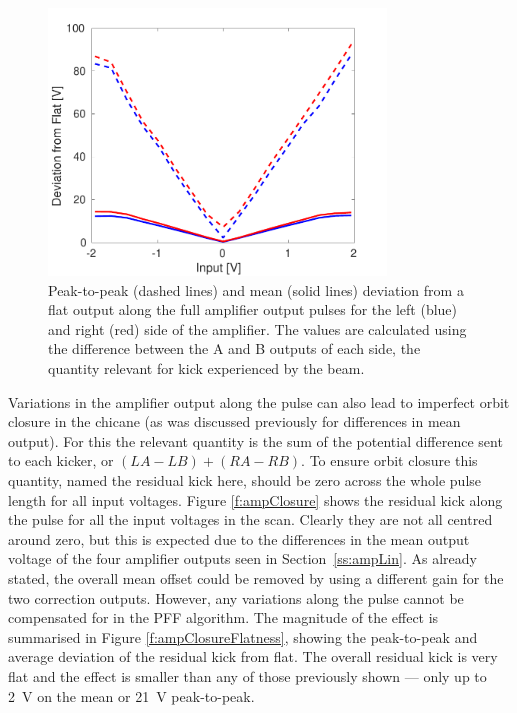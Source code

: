 \begin{figure}
  \centering
  \includegraphics[width=0.8\textwidth]{Figures/commissioning/AmpFlatness}
  \caption{Peak-to-peak (dashed lines) and mean (solid lines) deviation from a flat output along the full amplifier output pulses for the left (blue) and right (red) side of the amplifier. The values are calculated using the difference between the A and B outputs of each side, the quantity relevant for kick experienced by the beam.}
  \label{f:ampFlatness}
\end{figure}

Variations in the amplifier output along the pulse can also lead to imperfect orbit closure in the chicane (as was discussed previously for differences in mean output). For this the relevant quantity is the sum of the potential difference sent to each kicker, or \((LA-LB)+(RA-RB)\). To ensure orbit closure this quantity, named the residual kick here, should be zero across the whole pulse length for all input voltages. Figure \ref{f:ampClosure} shows the residual kick along the pulse for all the input voltages in the scan. Clearly they are not all centred around zero, but this is expected due to the differences in the mean output voltage of the four amplifier outputs seen in Section~\ref{ss:ampLin}. As already stated, the overall mean offset could be removed by using a different gain for the two correction outputs. However, any variations along the pulse cannot be compensated for in the PFF algorithm. The magnitude of the effect is summarised in Figure \ref{f:ampClosureFlatness}, showing the peak-to-peak and average deviation of the residual kick from flat. The overall residual kick is very flat and the effect is smaller than any of those previously shown --- only up to 2~V on the mean or 21~V peak-to-peak.


